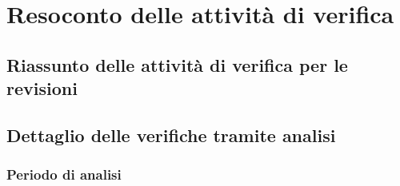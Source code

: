 \section{Resoconto delle attività di verifica}

\subsection{Riassunto delle attività di verifica per le revisioni}

\subsection{Dettaglio delle verifiche tramite analisi}

	\subsubsection{Periodo di analisi}